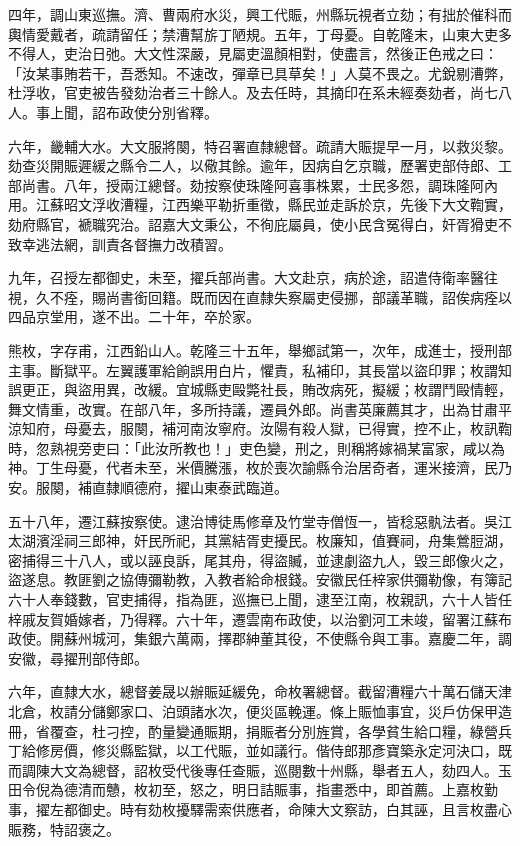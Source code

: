 \begin{pinyinscope}
四年，調山東巡撫。濟、曹兩府水災，興工代賑，州縣玩視者立劾；有拙於催科而輿情愛戴者，疏請留任；禁漕幫旂丁陋規。五年，丁母憂。自乾隆末，山東大吏多不得人，吏治日弛。大文性深嚴，見屬吏溫顏相對，使盡言，然後正色戒之曰：「汝某事賄若干，吾悉知。不速改，彈章已具草矣！」人莫不畏之。尤銳剔漕弊，杜浮收，官吏被告發劾治者三十餘人。及去任時，其摘印在系未經奏劾者，尚七八人。事上聞，詔布政使分別省釋。

六年，畿輔大水。大文服將闋，特召署直隸總督。疏請大賑提早一月，以救災黎。劾查災開賑遲緩之縣令二人，以儆其餘。逾年，因病自乞京職，歷署吏部侍郎、工部尚書。八年，授兩江總督。劾按察使珠隆阿喜事株累，士民多怨，調珠隆阿內用。江蘇昭文浮收漕糧，江西樂平勒折重徵，縣民並走訴於京，先後下大文鞫實，劾府縣官，褫職究治。詔嘉大文秉公，不徇庇屬員，使小民含冤得白，奸胥猾吏不致幸逃法網，訓責各督撫力改積習。

九年，召授左都御史，未至，擢兵部尚書。大文赴京，病於途，詔遣侍衛率醫往視，久不痊，賜尚書銜回籍。既而因在直隸失察屬吏侵挪，部議革職，詔俟病痊以四品京堂用，遂不出。二十年，卒於家。

熊枚，字存甫，江西鉛山人。乾隆三十五年，舉鄉試第一，次年，成進士，授刑部主事。斷獄平。左翼護軍給餉誤用白片，懼責，私補印，其長當以盜印罪；枚謂知誤更正，與盜用異，改緩。宜城縣吏毆斃社長，賄改病死，擬緩；枚謂鬥毆情輕，舞文情重，改實。在部八年，多所持議，遷員外郎。尚書英廉薦其才，出為甘肅平涼知府，母憂去，服闋，補河南汝寧府。汝陽有殺人獄，已得實，控不止，枚訊鞫時，忽熟視旁吏曰：「此汝所教也！」吏色變，刑之，則稱將嫁禍某富家，咸以為神。丁生母憂，代者未至，米價騰漲，枚於喪次諭縣令治居奇者，運米接濟，民乃安。服闋，補直隸順德府，擢山東泰武臨道。

五十八年，遷江蘇按察使。逮治博徒馬修章及竹堂寺僧恆一，皆稔惡骫法者。吳江太湖濱淫祠三郎神，奸民所祀，其黨結胥吏擾民。枚廉知，值賽祠，舟集鶯脰湖，密捕得三十八人，或以誣良訴，尾其舟，得盜贓，並逮劇盜九人，毀三郎像火之，盜遂息。教匪劉之協傳彌勒教，入教者給命根錢。安徽民任梓家供彌勒像，有簿記六十人奉錢數，官吏捕得，指為匪，巡撫已上聞，逮至江南，枚親訊，六十人皆任梓戚友賀婚嫁者，乃得釋。六十年，遷雲南布政使，以治劉河工未竣，留署江蘇布政使。開蘇州城河，集銀六萬兩，擇郡紳董其役，不使縣令與工事。嘉慶二年，調安徽，尋擢刑部侍郎。

六年，直隸大水，總督姜晟以辦賑延緩免，命枚署總督。截留漕糧六十萬石儲天津北倉，枚請分儲鄭家口、泊頭諸水次，便災區輓運。條上賑恤事宜，災戶仿保甲造冊，省覆查，杜刁控，酌量變通賑期，捐賑者分別旌賞，各學貧生給口糧，綠營兵丁給修房價，修災縣監獄，以工代賑，並如議行。偕侍郎那彥寶築永定河決口，既而調陳大文為總督，詔枚受代後專任查賑，巡閱數十州縣，舉者五人，劾四人。玉田令倪為德清而戇，枚初至，怒之，明日詰賑事，指畫悉中，即首薦。上嘉枚勤事，擢左都御史。時有劾枚擾驛需索供應者，命陳大文察訪，白其誣，且言枚盡心賑務，特詔褒之。


\end{pinyinscope}
